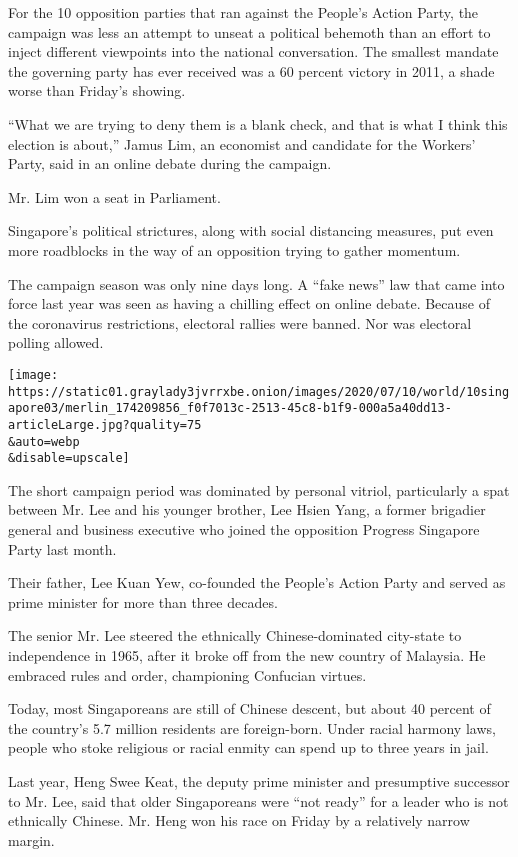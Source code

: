 For the 10 opposition parties that ran against the People's Action
Party, the campaign was less an attempt to unseat a political behemoth
than an effort to inject different viewpoints into the national
conversation. The smallest mandate the governing party has ever received
was a 60 percent victory in 2011, a shade worse than Friday's showing.

``What we are trying to deny them is a blank check, and that is what I
think this election is about,'' Jamus Lim, an economist and candidate
for the Workers' Party, said in an online debate during the campaign.

Mr. Lim won a seat in Parliament.

Singapore's political strictures, along with social distancing measures,
put even more roadblocks in the way of an opposition trying to gather
momentum.

The campaign season was only nine days long. A ``fake news'' law that
came into force last year was seen as having a chilling effect on online
debate. Because of the coronavirus restrictions, electoral rallies were
banned. Nor was electoral polling allowed.

\texttt{[image: https://static01.graylady3jvrrxbe.onion/images/2020/07/10/world/10singapore03/merlin\_174209856\_f0f7013c-2513-45c8-b1f9-000a5a40dd13-articleLarge.jpg?quality=75\\\&auto=webp\\\&disable=upscale]}

The short campaign period was dominated by personal vitriol,
particularly a spat between Mr. Lee and his younger brother, Lee Hsien
Yang, a former brigadier general and business executive who joined the
opposition Progress Singapore Party last month.

Their father, Lee Kuan Yew, co-founded the People's Action Party and
served as prime minister for more than three decades.

The senior Mr. Lee steered the ethnically Chinese-dominated city-state
to independence in 1965, after it broke off from the new country of
Malaysia. He embraced rules and order, championing Confucian virtues.

Today, most Singaporeans are still of Chinese descent, but about 40
percent of the country's 5.7 million residents are foreign-born. Under
racial harmony laws, people who stoke religious or racial enmity can
spend up to three years in jail.

Last year, Heng Swee Keat, the deputy prime minister and presumptive
successor to Mr. Lee, said that older Singaporeans were ``not ready''
for a leader who is not ethnically Chinese. Mr. Heng won his race on
Friday by a relatively narrow margin.

